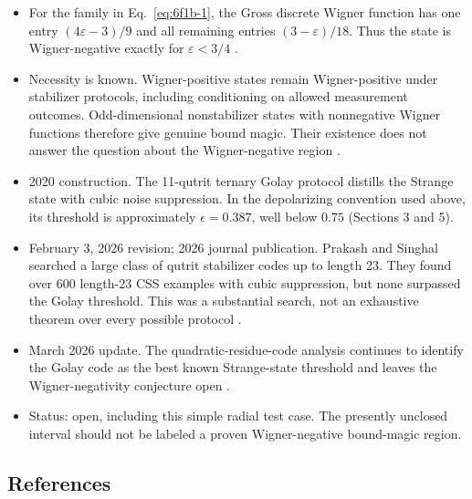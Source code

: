 \begin{itemize}
  \item For the family in Eq.~\eqref{eq:6f1b-1}, the Gross discrete Wigner function has one entry $(4\varepsilon-3)/9$ and all remaining entries $(3-\varepsilon)/18$. Thus the state is Wigner-negative exactly for $\varepsilon<3/4$ .

  \item Necessity is known. Wigner-positive states remain Wigner-positive under stabilizer protocols, including conditioning on allowed measurement outcomes. Odd-dimensional nonstabilizer states with nonnegative Wigner functions therefore give genuine bound magic. Their existence does not answer the question about the Wigner-negative region .

  \item 2020 construction. The 11-qutrit ternary Golay protocol distills the Strange state with cubic noise suppression. In the depolarizing convention used above, its threshold is approximately $\epsilon=0.387$, well below $0.75$  (Sections 3 and 5).

  \item February 3, 2026 revision; 2026 journal publication. Prakash and Singhal searched a large class of qutrit stabilizer codes up to length 23. They found over 600 length-23 CSS examples with cubic suppression, but none surpassed the Golay threshold. This was a substantial search, not an exhaustive theorem over every possible protocol .

  \item March 2026 update. The quadratic-residue-code analysis continues to identify the Golay code as the best known Strange-state threshold and leaves the Wigner-negativity conjecture open .

  \item Status: open, including this simple radial test case. The presently unclosed interval should not be labeled a proven Wigner-negative bound-magic region.
\end{itemize}

\subsection*{References}

